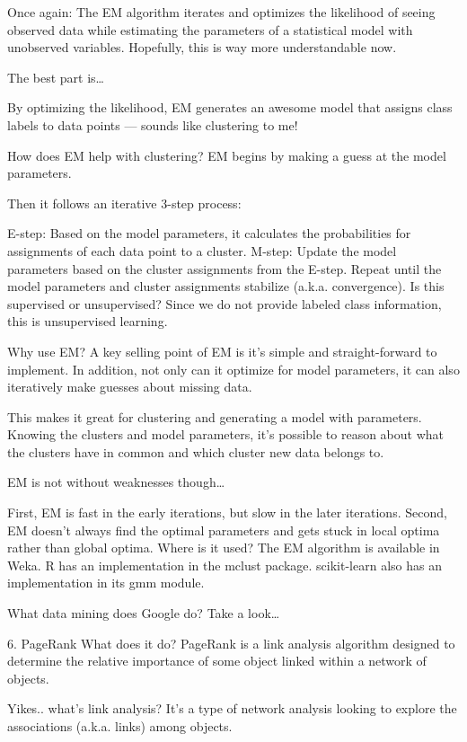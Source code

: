 Once again: The EM algorithm iterates and optimizes the likelihood of seeing observed data while estimating the parameters of a statistical model with unobserved variables. Hopefully, this is way more understandable now.

The best part is…

By optimizing the likelihood, EM generates an awesome model that assigns class labels to data points — sounds like clustering to me!

How does EM help with clustering? EM begins by making a guess at the model parameters.

Then it follows an iterative 3-step process:

E-step: Based on the model parameters, it calculates the probabilities for assignments of each data point to a cluster.
M-step: Update the model parameters based on the cluster assignments from the E-step.
Repeat until the model parameters and cluster assignments stabilize (a.k.a. convergence).
Is this supervised or unsupervised? Since we do not provide labeled class information, this is unsupervised learning.

Why use EM? A key selling point of EM is it’s simple and straight-forward to implement. In addition, not only can it optimize for model parameters, it can also iteratively make guesses about missing data.

This makes it great for clustering and generating a model with parameters. Knowing the clusters and model parameters, it’s possible to reason about what the clusters have in common and which cluster new data belongs to.

EM is not without weaknesses though…

First, EM is fast in the early iterations, but slow in the later iterations.
Second, EM doesn’t always find the optimal parameters and gets stuck in local optima rather than global optima.
Where is it used? The EM algorithm is available in Weka. R has an implementation in the mclust package. scikit-learn also has an implementation in its gmm module.

What data mining does Google do? Take a look…

6. PageRank
What does it do? PageRank is a link analysis algorithm designed to determine the relative importance of some object linked within a network of objects.

Yikes.. what’s link analysis? It’s a type of network analysis looking to explore the associations (a.k.a. links) among objects.


